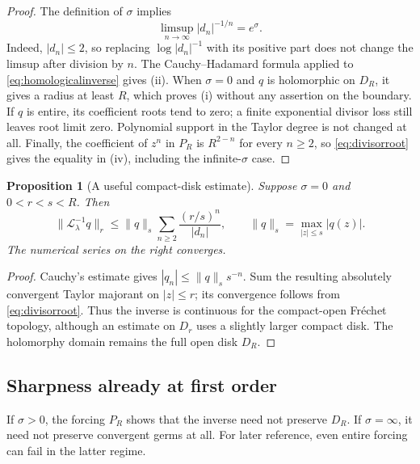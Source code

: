 \documentclass[11pt,a4paper]{article}
\numberwithin{equation}{section}
\newtheorem{proposition}[theorem]{Proposition}
\theoremstyle{definition}
\theoremstyle{remark}
\newcommand{\LL}{\mathcal L}
\newcommand{\norm}[1]{\lVert #1\rVert}
\begin{document}
\begin{proof}
The definition of $\sigma$ implies
\begin{equation}\label{eq:divisorroot}
 \limsup_{n\to\infty}|d_n|^{-1/n}=e^\sigma.
\end{equation}
Indeed, $|d_n|\le2$, so replacing $\log|d_n|^{-1}$ with its positive part
does not change the limsup after division by $n$.
The Cauchy--Hadamard formula applied to \eqref{eq:homologicalinverse}
gives (ii). When $\sigma=0$ and $q$ is holomorphic on $D_R$, it gives a
radius at least $R$, which proves (i) without any assertion on the
boundary. If $q$ is entire, its coefficient roots tend to zero; a finite
exponential divisor loss still leaves root limit zero. Polynomial support
in the Taylor degree is not changed at all. Finally, the coefficient of
$z^n$ in $P_R$ is $R^{2-n}$ for every $n\ge2$, so
\eqref{eq:divisorroot} gives the equality in (iv), including the
infinite-$\sigma$ case.
\end{proof}

\begin{proposition}[A useful compact-disk estimate]\label{prop:norm}
Suppose $\sigma=0$ and $0<r<s<R$. Then
\begin{equation}\label{eq:compactestimate}
 \norm{\LL_\lambda^{-1}q}_{r}
 \le \norm{q}_{s}
       \sum_{n\ge2}\frac{(r/s)^n}{|d_n|},
 \qquad
 \norm{q}_{s}=\max_{|z|\le s}|q(z)|.
\end{equation}
The numerical series on the right converges.
\end{proposition}

\begin{proof}
Cauchy's estimate gives $|q_n|\le\norm q_s s^{-n}$. Sum the resulting
absolutely convergent Taylor majorant on $|z|\le r$; its convergence follows
from \eqref{eq:divisorroot}. Thus the inverse is continuous for the
compact-open Fr\'echet topology, although an estimate on $D_r$ uses a
slightly larger compact disk. The holomorphy domain remains the full
open disk $D_R$.
\end{proof}

\subsection{Sharpness already at first order}

If $\sigma>0$, the forcing $P_R$ shows that the inverse need not preserve
$D_R$. If $\sigma=\infty$, it need not preserve convergent germs at all.
For later reference, even entire forcing can fail in the latter regime.
\end{document}

